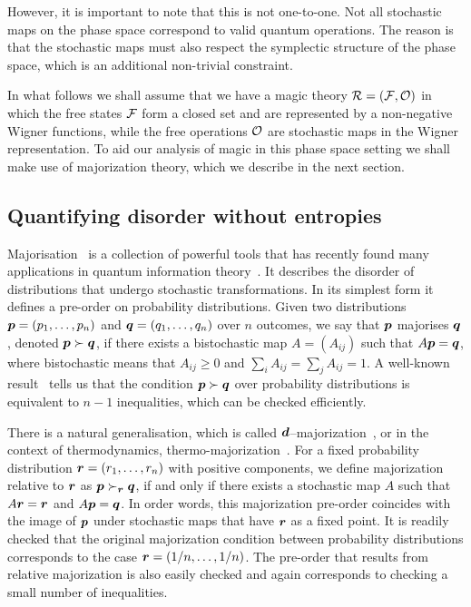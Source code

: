 \documentclass[pra,
aps,
twocolumn,
superscriptaddress,
groupedaddress,
nofootinbib,
reprint
]{revtex4-1}
\begin{document}
However, it is important to note that this is not one-to-one. Not all stochastic maps on the phase space correspond to valid quantum operations. The reason is that the stochastic maps must also respect the symplectic structure of the phase space, which is an additional non-trivial constraint.

In what follows we shall assume that we have a magic theory ${\mathcal R} = ({\mathcal F}, {\mathcal O})$ in which the free states ${\mathcal F}$ form a closed set and are represented by a non-negative Wigner functions, while the free operations ${\mathcal O}$ are stochastic maps in the Wigner representation. To aid our analysis of magic in this phase space setting we shall make use of majorization theory, which we describe in the next section.



\subsection{Quantifying disorder without entropies}
\label{sec:major}

Majorisation~\cite{cit:marshall, Blackwell_1953} is a collection of powerful tools that has recently found many applications in quantum information theory~\cite{Nielsen_1999, cit:cwiklinski, cit:lostaglio2, cit:gour, cit:gour2, Horodecki_2003, Vallejos_2021}.
It describes the disorder of distributions that undergo stochastic transformations. In its simplest form it defines a pre-order on probability distributions. Given two distributions $\boldsymbol{p}= (p_1, \dots, p_n)$ and $\boldsymbol{q} = (q_1, \dots, q_n)$ over $n$ outcomes, we say that $\boldsymbol{p}$ majorises $\boldsymbol{q}$, denoted $\boldsymbol{p} \succ \boldsymbol{q}$, if there exists a bistochastic map $A = (A_{ij})$ such that $A\boldsymbol{p} = \boldsymbol{q}$, where bistochastic means that $A_{ij} \geq 0$ and $\sum_i A_{ij} = \sum_j A_{ij} = 1$. A well-known result~\cite{cit:marshall} tells us that the condition $ \boldsymbol{p} \succ \boldsymbol{q}$ over probability distributions is equivalent to $n-1$ inequalities, which can be checked efficiently.

There is a natural generalisation, which is called $\bm{d}$--majorization~\cite{Veinott_1971}, or in the context of thermodynamics, thermo-majorization~\cite{cit:horodecki2013}. For a fixed probability distribution $\boldsymbol{r} = (r_1, \dots, r_n)$ with positive components, we define majorization relative to $\boldsymbol{r}$ as $\boldsymbol{p} \succ_{\boldsymbol{r}} \boldsymbol{q}$, if and only if there exists a stochastic map $A$ such that $A\boldsymbol{r} = \boldsymbol{r}$ and $A \boldsymbol{p} = \boldsymbol{q}$. In order words, this majorization pre-order coincides with the image of $\boldsymbol{p}$ under stochastic maps that have $\boldsymbol{r}$ as a fixed point. It is readily checked that the original majorization condition between probability distributions corresponds to the case $\boldsymbol{r} = (1/n, \dots, 1/n)$. The pre-order that results from relative majorization is also easily checked and again corresponds to checking a small number of inequalities.
\end{document}
